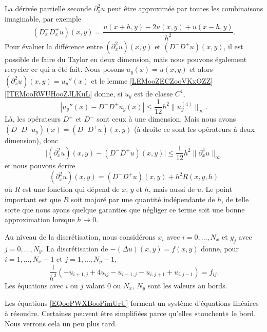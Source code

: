 La dérivée partielle seconde \( \partial^2_xu\) peut être approximée par toutes les combinaisons imaginable, par exemple
\begin{equation}
    (D^-_xD^+_xu)(x,y)=\frac{ u(x+h,y)-2u(x,y)+u(x-h,y) }{ h^2 }.
\end{equation}
Pour évaluer la différence entre \( (\partial^2_xu)(x,y)\) et \( (D^-D^+u)(x,y)\), il est possible de faire du Taylor en deux dimension, mais nous pouvons également recycler ce qui a été fait. Nous posons \( u_y(x)=u(x,y)\) et alors \( (\partial_x^2u)(x,y)=u_y''(x)\) et le lemme \ref{LEMooZECZooVKxOZZ}\ref{ITEMooRWUHooZJLKuL} donne, si \( u_y\) est de classe \( C^4\),
\begin{equation}
    | u_y''(x)-D^-D^+u_y(x) |\leq \frac{1}{ 12 }h^2\| u_y^{(4)} \|_{\infty}.
\end{equation}
Là, les opérateurs \( D^+\) et \( D^-\) sont ceux à une dimension. Mais nous avons \( (D^-D^+u_y)(x)=(D^-D^+u)(x,y)\) (à droite ce sont les opérateurs à deux dimension), donc
\begin{equation}
    \big| (\partial^2_xu)(x,y)-(D^-D^+u)(x,y) \big|\leq \frac{1}{ 12 }h^2\| \partial^4_xu \|_{\infty}
\end{equation}
et nous pouvons écrire
\begin{equation}        \label{EQooCLSCooYLYJkU}
    (\partial^2_xu)(x,y)=(D^-D^+u)(x,y)+h^2R(x,y,h)
\end{equation}
où \( R\) est une fonction qui dépend de \( x\), \( y\) et \( h\), mais aussi de \( u\). Le point important est que \( R\) soit majoré par une quantité indépendante de \( h\), de telle sorte que nous ayons quelque garanties que négliger ce terme soit une bonne approximation lorsque \( h\to 0\).

Au niveau de la discrétisation, nous considérons \( x_i\) avec \( i=0,\ldots, N_x\) et \( y_j\) avec \( j=0,\ldots, N_y\). La discrétisation de \( -(\Delta u)(x,y)=f(x,y)\) donne, pour \( i=1,\ldots, N_x-1\) et \( j=1,\ldots, N_y-1\),
\begin{equation}        \label{EQooPWXBooPimUrU}
    \frac{1}{ h^2 }(-u_{i+1,j}+4u_{ij}-u_{i-1,j}-u_{i,j+1}+u_{i,j-1})=f_{ij}.
\end{equation}
Les équations avec \( i\) ou \( j\) valant \( 0\) ou \( N_x\), \( N_y\) sont les valeurs au bords.

Les équations \eqref{EQooPWXBooPimUrU} forment un système d'équations linéaires à résoudre. Certaines peuvent être simplifiées parce qu'elles «touchent» le bord. Nous verrons cela un peu plus tard.

